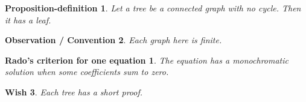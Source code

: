 \documentclass{amsart}
\newtheorem{pd}{Proposition-definition}
\newtheorem{oc}[pd]{Observation / Convention}
\newtheorem*{rado}{Rado's criterion for one equation}
\newtheorem{wish}[pd]{Wish}
\begin{document}
\begin{pd} Let a tree be a connected graph with no cycle. Then it has a leaf. \end{pd}
\begin{oc} Each graph here is finite. \end{oc}
\begin{rado} The equation has a monochromatic solution when some coefficients sum to zero. \end{rado}
\begin{wish} Each tree has a short proof. \end{wish}
\end{document}
